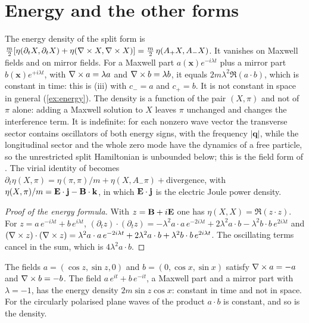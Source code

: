 \section{Energy and the other forms}

\begin{proposition}
\label{prop:energy}
The energy density of the split form is $\tfrac m2[\eta(\partial_tX,\partial_tX)+\eta(\nabla\times X,\nabla\times X)]=\tfrac m2\,\eta(A_+X,A_-X)$. It
vanishes on Maxwell fields and on mirror fields. For a Maxwell part $a(\mathbf x)e^{-i\lambda t}$ plus a mirror part
$b(\mathbf x)e^{+i\lambda t}$, with $\nabla\times a=\lambda a$ and $\nabla\times b=\lambda b$, it equals $2m\lambda^2\Re(a\cdot b)$, which is constant in
time: this is (iii) with $c_-=a$ and $c_+=b$. It is not constant in space in general (\cref{ex:energy}). The density is a
function of the pair $(X,\pi)$ and not of $\pi$ alone: adding a Maxwell solution to $X$ leaves $\pi$ unchanged and changes the
interference term. It is indefinite: for each nonzero wave vector the transverse sector contains oscillators of both energy signs, with
the frequency $|\mathbf q|$, while the longitudinal sector and the whole zero mode have the dynamics of a free particle, so the unrestricted
split Hamiltonian is unbounded below; this is the field form of . The virial identity of  becomes
$\partial_t\eta(X,\pi)=\eta(\pi,\pi)/m+\eta(X,A_-\pi)+\text{divergence}$, with $\eta(X,\pi)/m=\mathbf E\cdot\mathbf j-\mathbf B\cdot\mathbf k$, in which
$\mathbf E\cdot\mathbf j$ is the electric Joule power density.
\end{proposition}

\begin{proof}[Proof of the energy formula]
With $z=\mathbf B+i\mathbf E$ one has $\eta(X,X)=\Re(z\cdot z)$. For $z=a\,e^{-i\lambda t}+b\,e^{i\lambda t}$,
$(\partial_tz)\cdot(\partial_tz)=-\lambda^2a\cdot a\,e^{-2i\lambda t}+2\lambda^2a\cdot b-\lambda^2b\cdot b\,e^{2i\lambda t}$ and
$(\nabla\times z)\cdot(\nabla\times z)=\lambda^2a\cdot a\,e^{-2i\lambda t}+2\lambda^2a\cdot b+\lambda^2b\cdot b\,e^{2i\lambda t}$. The oscillating terms
cancel in the sum, which is $4\lambda^2a\cdot b$.
\end{proof}

\begin{example}
\label{ex:energy}
The fields $a=(\cos z,\sin z,0)$ and $b=(0,\cos x,\sin x)$ satisfy $\nabla\times a=-a$ and $\nabla\times b=-b$. The field $a\,e^{it}+b\,e^{-it}$, a
Maxwell part and a mirror part with $\lambda=-1$, has the energy density $2m\sin z\cos x$: constant in time and not in space. For the
circularly polarised plane waves of  the product $a\cdot b$ is constant, and so is the density.
\end{example}

